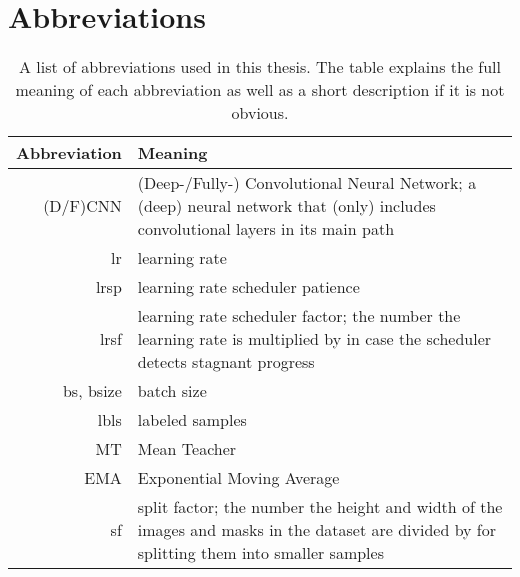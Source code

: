 \chapter{Abbreviations}
{
    \renewcommand*{\arraystretch}{1.1}
    \begin{table}[htbp]
        \centering
        \begin{tabular}{rp{}} 
            \toprule
            Abbreviation & Meaning\\
            \midrule 
            (D/F)CNN & (Deep-/Fully-) Convolutional Neural Network; a (deep) neural network that (only) includes convolutional layers in its main path\\
            lr & learning rate\\
            lrsp & learning rate scheduler patience\\
            lrsf & \linespread{1.0}\selectfont learning rate scheduler factor; the number the learning rate is multiplied by in case the scheduler detects stagnant progress\\
            bs, bsize & batch size\\
            lbls & labeled samples \\
            MT & Mean Teacher \\
            EMA & Exponential Moving Average \\
            sf & \linespread{1.0}\selectfont split factor; the number the height and width of the images and masks in the dataset are divided by for splitting them into smaller samples\\
            \bottomrule
        \end{tabular}
        \vspace{0.1cm}
        \caption{A list of abbreviations used in this thesis. The table explains the full meaning of each abbreviation as well as a short description if it is not obvious.}
        \label{tab:abbreviations}
    \end{table}
}